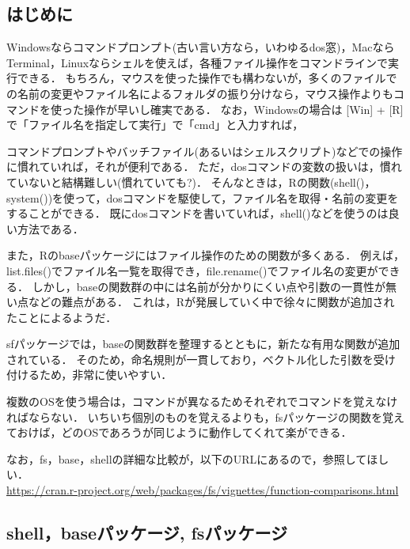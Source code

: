 \documentclass[
]{article}
\begin{document}
\hypertarget{ux306fux3058ux3081ux306b-1}{%
\subsection{はじめに}\label{ux306fux3058ux3081ux306b-1}}

Windowsならコマンドプロンプト(古い言い方なら，いわゆるdos窓)，MacならTerminal，Linuxならシェルを使えば，各種ファイル操作をコマンドラインで実行できる．
もちろん，マウスを使った操作でも構わないが，多くのファイルでの名前の変更やファイル名によるフォルダの振り分けなら，マウス操作よりもコマンドを使った操作が早いし確実である．
なお，Windowsの場合は {[}Win{]} + {[}R{]} で「ファイル名を指定して実行」で「cmd」と入力すれば，

コマンドプロンプトやバッチファイル(あるいはシェルスクリプト)などでの操作に慣れていれば，それが便利である．
ただ，dosコマンドの変数の扱いは，慣れていないと結構難しい(慣れていても?)．
そんなときは，Rの関数(shell()，system())を使って，dosコマンドを駆使して，ファイル名を取得・名前の変更をすることができる．
既にdosコマンドを書いていれば，shell()などを使うのは良い方法である．

また，Rのbaseパッケージにはファイル操作のための関数が多くある．
例えば，list.files()でファイル名一覧を取得でき，file.rename()でファイル名の変更ができる．
しかし，baseの関数群の中には名前が分かりにくい点や引数の一貫性が無い点などの難点がある．
これは，Rが発展していく中で徐々に関数が追加されたことによるようだ．

sfパッケージでは，baseの関数群を整理するとともに，新たな有用な関数が追加されている．
そのため，命名規則が一貫しており，ベクトル化した引数を受け付けるため，非常に使いやすい．

複数のOSを使う場合は，コマンドが異なるためそれぞれでコマンドを覚えなければならない．
いちいち個別のものを覚えるよりも，fsパッケージの関数を覚えておけば，どのOSであろうが同じように動作してくれて楽ができる．

なお，fs，base，shellの詳細な比較が，以下のURLにあるので，参照してほしい．\\
\url{https://cran.r-project.org/web/packages/fs/vignettes/function-comparisons.html}

\hypertarget{shellbaseux30d1ux30c3ux30b1ux30fcux30b8-fsux30d1ux30c3ux30b1ux30fcux30b8}{%
\subsection{shell，baseパッケージ, fsパッケージ}\label{shellbaseux30d1ux30c3ux30b1ux30fcux30b8-fsux30d1ux30c3ux30b1ux30fcux30b8}}
\end{document}
